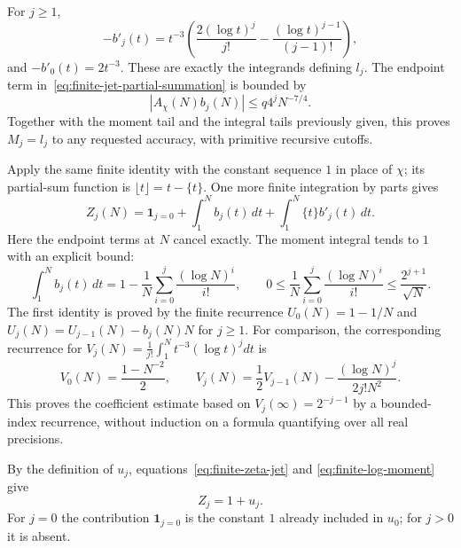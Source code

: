 For $j\geq1$,
\[
 -b'_j(t)=t^{-3}\left(\frac{2(\log t)^j}{j!}
            -\frac{(\log t)^{j-1}}{(j-1)!}\right),
\]
and $-b'_0(t)=2t^{-3}$.  These are exactly the integrands defining $l_j$.
The endpoint term in~\eqref{eq:finite-jet-partial-summation} is bounded by
\[
 |A_\chi(N)b_j(N)|\leq q4^jN^{-7/4}.
\]
Together with the moment tail and the integral tails previously given,
this proves $M_j=l_j$ to any requested accuracy, with primitive recursive
cutoffs.

Apply the same finite identity with the constant sequence $1$ in place of
$\chi$; its partial-sum function is $\lfloor t\rfloor=t-\{t\}$.  One more
finite integration by parts gives
\begin{equation}
 Z_j(N)=\mathbf1_{j=0}+\int_1^N b_j(t)\,dt
                         +\int_1^N\{t\}b'_j(t)\,dt.
 \label{eq:finite-zeta-jet}
\end{equation}
Here the endpoint terms at $N$ cancel exactly.  The moment integral tends
to $1$ with an explicit bound:
\begin{equation}
 \int_1^N b_j(t)\,dt
     =1-\frac1N\sum_{i=0}^j\frac{(\log N)^i}{i!},
 \qquad
 0\leq\frac1N\sum_{i=0}^j\frac{(\log N)^i}{i!}
       \leq\frac{2^{j+1}}{\sqrt N}.
 \label{eq:finite-log-moment}
\end{equation}
The first identity is proved by the finite recurrence
$U_0(N)=1-1/N$ and
$U_j(N)=U_{j-1}(N)-b_j(N)N$ for $j\geq1$.
For comparison, the corresponding recurrence for
$V_j(N)=\frac1{j!}\int_1^N t^{-3}(\log t)^jdt$ is
\[
 V_0(N)=\frac{1-N^{-2}}2,\qquad
 V_j(N)=\frac12V_{j-1}(N)
             -\frac{(\log N)^j}{2j!N^2}.
\]
This proves the coefficient estimate based on
$V_j(\infty)=2^{-j-1}$ by a bounded-index recurrence, without induction on
a formula quantifying over all real precisions.

By the definition of $u_j$, equations~\eqref{eq:finite-zeta-jet} and
\eqref{eq:finite-log-moment} give
\begin{equation}
 Z_j=1+u_j.
 \label{eq:zeta-jet-identification}
\end{equation}
For $j=0$ the contribution $\mathbf1_{j=0}$ is the constant $1$ already
included in $u_0$; for $j>0$ it is absent.

